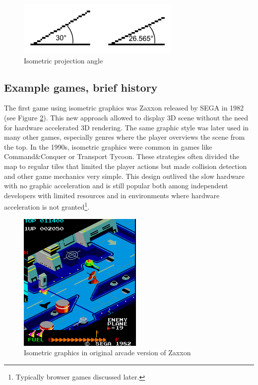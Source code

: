 \documentclass[11pt,oneside, final]{fithesis2}
\begin{document}
\begin{figure}[htp]
	\centering
	\includegraphics[width=0.7\textwidth]{thesis-angles}
	\caption{Isometric projection angle}
	\label{isoangle}
\end{figure}

\subsection{Example games, brief history}
The first game using isometric graphics was Zaxxon released by SEGA in 1982\cite{zaxxon} (see Figure \ref{zaxxon}). This new approach allowed to display 3D scene without the need for hardware accelerated 3D rendering. The same graphic style was later used in many other games, especially genres where the player overviews the scene from the top. In the 1990s, isometric graphics were common in games like Command\&Conquer or Transport Tycoon. These strategies often divided the map to regular tiles that limited the player actions but made collision detection and other game mechanics very simple. This design outlived the slow hardware with no graphic acceleration and is still popular both among independent developers with limited resources and in environments where hardware acceleration is not granted\footnote{Typically browser games discussed later.}.

\begin{figure}[htp]
	\centering
	\includegraphics{zaxxon}
	\caption{Isometric graphics in original arcade version of Zaxxon\cite{zaxxon}}
	\label{zaxxon}
\end{figure}
\end{document}
